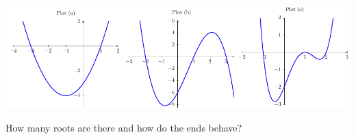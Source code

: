 \begin{activity}
\begin{center}
                    \includegraphics[width=0.99\columnwidth]{figures/0-6-fig5.pdf}
				\end{center}      
\end{activity}
\begin{smallhint}
How many roots are there and how do the ends behave?
\end{smallhint}
